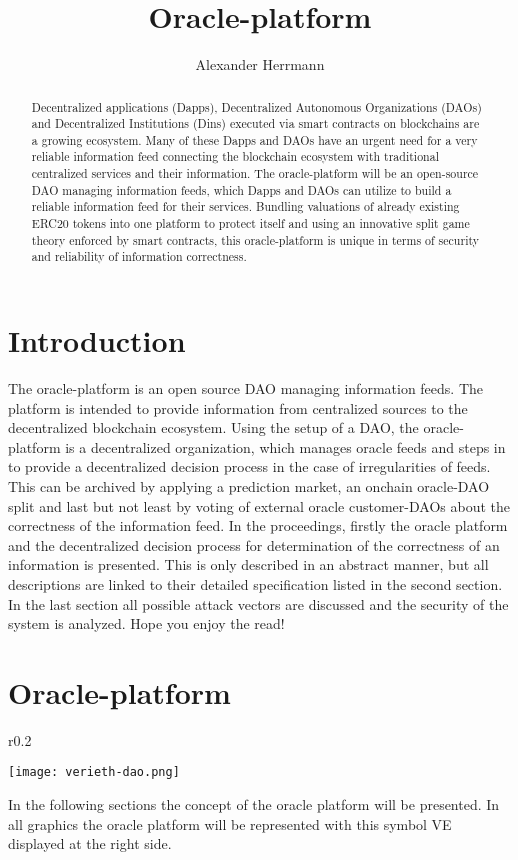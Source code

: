 \documentclass[a4paper]{article}
\title{Oracle-platform}
\author{Alexander Herrmann}
\begin{document}
\maketitle

\begin{abstract}Decentralized applications (Dapps), Decentralized Autonomous Organizations (DAOs) and Decentralized Institutions (Dins) executed via smart contracts on blockchains are a growing ecosystem. Many of these Dapps and DAOs have an urgent need for a very reliable information feed connecting the blockchain ecosystem with traditional centralized services and their information. The oracle-platform will be an open-source DAO managing information feeds, which Dapps and DAOs can utilize to build a reliable information feed for their services. Bundling valuations of already existing ERC20 tokens into one platform to protect itself and using an innovative split game theory enforced by smart contracts, this oracle-platform is unique in terms of security and reliability of information correctness.
\end{abstract}

\section{Introduction}

The oracle-platform is an open source DAO managing information feeds. The platform is intended to provide information from centralized sources to the decentralized blockchain ecosystem. Using the setup of a DAO, the oracle-platform is a decentralized organization, which manages oracle feeds and steps in to provide a decentralized decision process in the case of irregularities of feeds. This can be archived by applying a prediction market, an onchain oracle-DAO split and last but not least by voting of external oracle customer-DAOs about the correctness of the information feed.
In the proceedings, firstly the oracle platform and the decentralized decision process for determination of the correctness of an information is presented. This is only described in an abstract manner, but all descriptions are linked to their detailed specification listed in the second section. In the last section all possible attack vectors are discussed and the security of the system is analyzed. Hope you enjoy the read!

\section{Oracle-platform}
\begin{wrapfigure}{r}{0.2\textwidth}
  \vspace{-1pt}
  \begin{center}
    \texttt{[image: verieth-dao.png]}
  \end{center}
  \vspace{-1pt}
  
\end{wrapfigure}
In the following sections the concept of the oracle platform will be presented. In all graphics the oracle platform will be represented with this symbol VE displayed at the right side.
\end{document}
